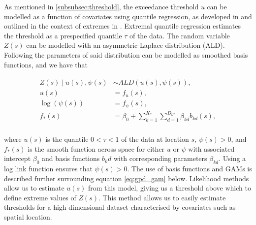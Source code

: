 \documentclass{article}
\numberwithin{equation}{section}
\begin{document}
As mentioned in \ref{subsubsec:threshold}, the exceedance threshold $u$ can be modelled as a function of covariates using quantile regression, as developed in \cite{Yu2001} and outlined in the context of extremes in \cite{Youngman2019}.
Extremal quantile regression estimates the threshold as a prespecified quantile $\tau$ of the data. 
The random variable $Z(s)$ can be modelled with an asymmetric Laplace distribution (ALD).
Following \cite{Youngman2019} the parameters of said distribution can be modelled as smoothed basis functions, and we have that
\begin{center}
  \begin{align} \label{eq:asymmetric_laplace}
    \begin{split}
      Z(s) \mid u(s), \psi(s) &\sim ALD(u(s), \psi(s)), \\
      u(s) &= f_u(s), \\
      \log(\psi(s)) &= f_{\psi}(s), \\
      f_*(s) &= \beta_0 + \sum_{k = 1}^{K_*}{\sum_{d = 1}^{D_k{_*}}\beta_{kd}b_{kd}(s)}, \\
    \end{split}
  \end{align}
\end{center}
where $u(s)$ is the quantile $0 < \tau < 1$ of the data at location $s$, $\psi(s) > 0$, and $f_*(s)$ is the smooth function across space for either $u$ or $\psi$ with associated intercept $\beta_0$ and basis functions $b_kd$ with corresponding parameters $\beta_{kd}$.
Using a log link function ensures that $\psi(s) > 0$.
The use of basis functions and GAMs is described further surrounding equation \ref{eq:gpd_gam} below. 
Likelihood methods allow us to estimate $u(s)$ from this model, giving us a threshold above which to define extreme values of $Z(s)$.
This method allows us to easily estimate thresholds for a high-dimensional dataset characterised by covariates such as spatial location.
\end{document}
